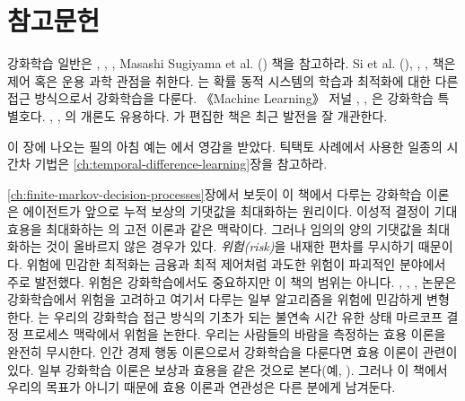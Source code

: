 \section*{참고문헌}

강화학습 일반은 \textcite{Szepesvari2010}, \textcite{BertsekasTsitsiklis1996},
\textcite{Kaelbling1993a}, Masashi Sugiyama et al.
(\cite*{SugiyamaHachiyaMorimura2013}) 책을 참고하라. Si et al.
(\cite*{SiBartoPowellWunsch2004}), \textcite{Powell2011},
\textcite{LewisLiu2012}, \textcite{Bertsekas2012} 책은 제어 혹은 운용 과학
관점을 취한다. \textcite{Cao2009}는 확률 동적 시스템의 학습과 최적화에 대한 다른
접근 방식으로서 강화학습을 다룬다. 《Machine Learning》 저널
\textcite{Sutton1992}, \textcite{Kaelbling1996}, \textcite{Singh2002}은 강화학습
특별호다. \textcite{Barto1995b}, \textcite{KaelblingLittmanMoore1996},
\textcite{KeerthiRavindran1997}의 개론도 유용하다.
\textcite{WieringVanOtterlo2012}가 편집한 책은 최근 발전을 잘 개관한다.

이 장에 나오는 필의 아침 예는 \textcite{Agre1988}에서 영감을 받았다. 틱택토
사례에서 사용한 일종의 시간차 기법은 \ref{ch:temporal-difference-learning}장을
참고하라.


\ref{ch:finite-markov-decision-processes}장에서 보듯이 이 책에서 다루는 강화학습
이론은 에이전트가 앞으로 누적 보상의 기댓값을 최대화하는 원리이다. 이성적 결정이
기대 효용을 최대화하는 \textcite{VonNeumannMorgenstern1944}의 고전 이론과 같은
맥락이다. 그러나 임의의 양의 기댓값을 최대화하는 것이 올바르지 않은 경우가 있다.
\emph{위험(risk)}을 내재한 편차를 무시하기 때문이다. 위험에 민감한 최적화는
금융과 최적 제어처럼 과도한 위험이 파괴적인 분야에서 주로 발전했다. 위험은
강화학습에서도 중요하지만 이 책의 범위는 아니다. \textcite{Heger1994},
\textcite{Geibel2001}, \textcite{MihatschNeuneier2002}, \textcite{Borkar2002}
논문은 강화학습에서 위험을 고려하고 여기서 다루는 일부 알고리즘을 위험에
민감하게 변형한다. \textcite{CoraluppiMarcus1999}는 우리의 강화학습 접근 방식의
기초가 되는 불연속 시간 유한 상태 마르코프 결정 프로세스 맥락에서 위험을 논한다.
우리는 사람들의 바람을 측정하는 효용 이론을 완전히 무시한다. 인간 경제 행동
이론으로서 강화학습을 다룬다면 효용 이론이 관련이 있다. 일부 강화학습 이론은
보상과 효용을 같은 것으로 본다(예, \textcite{RussellNorvig2010}). 그러나 이
책에서 우리의 목표가 아니기 때문에 효용 이론과 연관성은 다른 분에게 남겨둔다.


